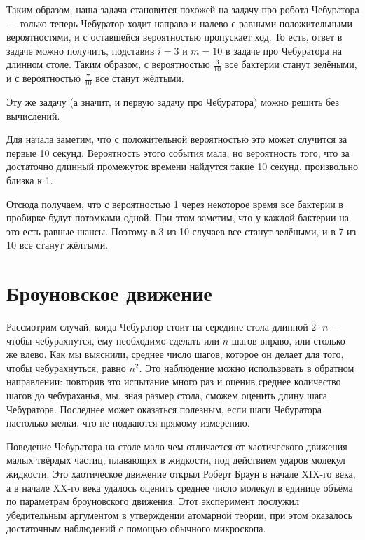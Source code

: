 \documentclass{article}
\begin{document}
Таким образом, наша задача становится похожей на задачу про робота Чебуратора --- только теперь Чебуратор ходит направо и налево с равными положительными вероятностями, и с оставшейся вероятностью пропускает ход.
То есть, ответ в задаче можно получить, подставив $i=3$ и $m=10$ в задаче про Чебуратора на длинном столе.
Таким образом, с вероятностью $\tfrac{3}{10}$ все бактерии станут зелёными, 
и с вероятностью $\tfrac{7}{10}$ все станут жёлтыми.

\medskip

Эту же задачу (а значит, и первую задачу про Чебуратора)
можно решить без вычислений.

Для начала заметим, что с положительной вероятностью это может случится за первые 10 секунд. 
Вероятность этого события мала,
но вероятность того, что за достаточно длинный промежуток времени найдутся такие 10 секунд, произвольно близка к 1.

Отсюда получаем, что с вероятностью 1
через некоторое время все бактерии в пробирке будут потомками одной.
При этом заметим, что у каждой бактерии на это есть равные шансы.
Поэтому в 3 из 10 случаев все станут зелёными, и в 7 из 10 все станут жёлтыми.


\section{Броуновское движение}

Рассмотрим случай, когда Чебуратор стоит на середине стола длинной $2\cdot n$ ---
чтобы чебурахнутся, ему необходимо сделать или $n$ шагов вправо, или столько же влево.
Как мы выяснили, среднее число шагов, которое он делает для того, чтобы чебурахнуться, 
равно $n^2$. Это наблюдение можно использовать в обратном направлении:
повторив это испытание много раз и оценив среднее количество шагов до чебураханья, мы, 
зная размер стола, сможем оценить длину шага Чебуратора.
Последнее может оказаться полезным, если шаги Чебуратора настолько мелки, что не поддаются прямому измерению. 

Поведение Чебуратора на столе мало чем отличается 
от хаотического движения малых твёрдых частиц, плавающих в жидкости, под действием ударов молекул жидкости. 
Это хаотическое движение открыл Роберт Браун в начале XIX-го века, а в начале XX-го века удалось оценить
среднее число молекул в единице объёма по параметрам броуновского движения.
Этот эксперимент послужил убедительным аргументом в утверждении атомарной теории, при этом оказалось достаточным
наблюдений с помощью обычного микроскопа.
\end{document}
